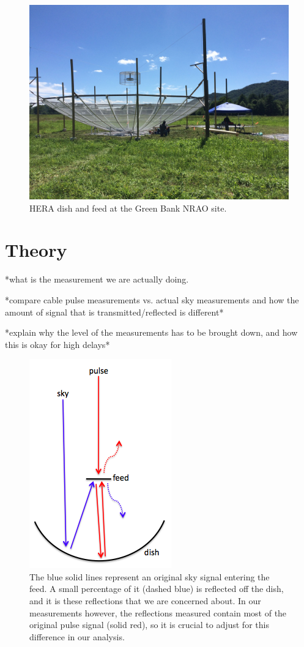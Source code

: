\documentclass[12pt,preprint]{aastex}
\begin{document}
\begin{figure}
\centering
\includegraphics[trim={2cm 20cm 30cm 15cm},clip, totalheight=0.45\textheight]{plots/heradish.jpg}
\caption{HERA dish and feed at the Green Bank NRAO site.}
\label{fig:heradish}
\end{figure}

\section{Theory}

*what is the measurement we are actually doing. 

*compare cable pulse measurements vs. actual sky measurements and how the amount of signal that is transmitted/reflected is different*

*explain why the level of the measurements has to be brought down, and how this is okay for high delays*

\begin{figure}
\centering
\includegraphics[totalheight=0.5\textheight]{plots/reflection_cartoon.png}
\caption{The blue solid lines represent an original sky signal entering the feed. A small percentage of it (dashed blue) is reflected off the dish, and it is these reflections that we are concerned about. In our measurements however, the reflections measured contain most of the original pulse signal (solid red), so it is crucial to adjust for this difference in our analysis.}
\end{figure}
\end{document}
